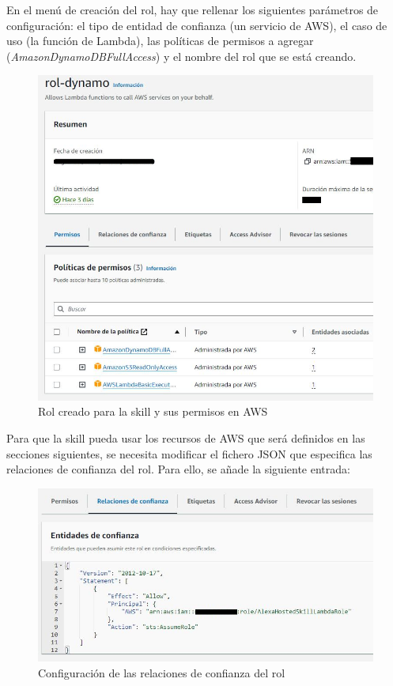 En el menú de creación del rol, hay que rellenar los siguientes parámetros de configuración: el tipo de entidad de confianza (un servicio de AWS), el caso de uso (la función de Lambda), las políticas de permisos a agregar (\textit{AmazonDynamoDBFullAccess}) y el nombre del rol que se está creando.

\begin{figure}[H]
	\centering
	\includegraphics[width=1\textwidth]{imgs/aws-iam-1.png}
	\caption{Rol creado para la skill y sus permisos en AWS}
	\label{fig:aws-iam-1}
\end{figure}

Para que la skill pueda usar los recursos de AWS que será definidos en las secciones siguientes, se necesita modificar el fichero JSON que especifica las relaciones de confianza del rol. Para ello, se añade la siguiente entrada:

\begin{figure}[H]
	\centering
	\includegraphics[width=1\textwidth]{imgs/aws-iam-3.png}
	\caption{Configuración de las relaciones de confianza del rol}
	\label{fig:aws-iam-3}
\end{figure}

